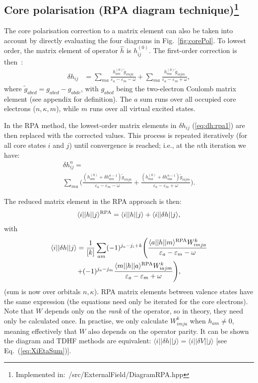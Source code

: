 \documentclass[10pt,twocolumn,a4paper]{article}%
\newcommand{\bra}[1]{\ensuremath{\langle #1|}}	%
\newcommand{\ket}[1]{\ensuremath{|#1\rangle}}	%
\newcommand{\be}{\begin{equation}}
\newcommand{\ee}{\end{equation}}
\def\en{\ensuremath{\varepsilon}}
\renewcommand{\k}{\ensuremath{\kappa}}
\begin{document}
\subsection[Core polarisation (RPA diagram technique)]{Core polarisation (RPA diagram technique)\footnote{Implemented in:~/src/ExternalField/DiagramRPA.hpp}\label{sec:RPA-diagram}}

The core polarisation correction to a matrix element can also be taken into account by directly evaluating the four diagrams in Fig.~\ref{fig:corePol}.
To lowest order, the matrix element of operator $\hat h$ is $h_{ij}^{(0)}$. 
The first-order correction is then~\cite{Lindgren1986}:
\begin{align}
\delta h_{ij} &= 
\sum_{ma}\frac{h_{am}^{(0)}\widetilde g_{imja}}{\en_a - \en_m - \omega}
+ \sum_{ma}\frac{h_{ma}^{(0)}\widetilde g_{iajm}}{\en_a - \en_m + \omega},
\label{eq:dh:rpa1}
\end{align}
where
$ \widetilde g_{abcd} =  g_{abcd} -  g_{abdc}$, with 
$g_{abcd}$ being the two-electron Coulomb matrix element (see appendix for definition).
The $a$ sum runs over all occupied core electrons ($n,\k,m$), while $m$ runs over all virtual excited states.

In the RPA method, the lowest-order matrix elements in $\delta h_{ij}$ (\ref{eq:dh:rpa1}) are then replaced with the corrected values. This process is repeated iteratively (for all core states $i$ and $j$) until convergence is reached; i.e., at the $n$th iteration we have:
\begin{multline}
\delta h_{ij}^{n} = \\
\sum_{ma}\Bigg(\frac{(h_{am}^{(0)}+\delta h_{am}^{n-1})\widetilde g_{imja}}{\en_a - \en_m - \omega}
+ \frac{(h_{ma}^{(0)}+\delta h_{ma}^{n-1})\widetilde g_{iajm}}{\en_a - \en_m + \omega}\Bigg).
\end{multline}

The reduced matrix element in the RPA approach is then:
\be
\bra{i}|h|\ket{j}^{\rm RPA} = \bra{i}|h|\ket{j} + \bra{i}|\delta h|\ket{j},
\ee
with
\begin{multline}
\bra{i}|\delta h|\ket{j} = 
\frac{1}{[k]}\sum_{am}(-1)^{j_a-j_i+k}\Bigg(
 \frac{\bra{a}|h|\ket{m}^{\rm RPA}W^k_{imja}}{\en_a-\en_m-\omega}\\
+ (-1)^{j_a-j_m}\frac{\bra{m}|h|\ket{a}^{\rm RPA}W^k_{iajm}}{\en_a-\en_m+\omega}
\Bigg),
\end{multline}
(sum is now over {\rm orbitals $n,\k$}).
RPA matrix elements between valence states have the same expression (the equations need only be iterated for the core electrons).
Note that $W$ depends only on the {\em rank} of the operator, so in theory, they need only be calculated once.
In practise, we only calculate $W^k_{imja}$ when $h_{am}\neq0$, meaning effectively that $W$ also depends on the operator parity.
It can be shown the diagram and TDHF methods are equivalent:
 $\bra{i}|\delta h|\ket{j}=\bra{i}|\delta V|\ket{j}$ [see Eq.~(\ref{eq:XiEtaSum})].
\end{document}
